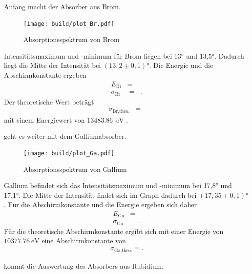 \justifying Anfang macht der Absorber aus Brom.


\begin{figure}[H]
    \centering
    \texttt{[image: build/plot\_Br.pdf]}
    \caption{Absorptionsspektrum von Brom\cite{matplotlib}}
    \label{fig:4}
\end{figure}

\justifying Intensitätsmaximum und -minimum für Brom liegen bei 13° und 13,5°.
Dadurch liegt die Mitte der Intensität bei $(13,2\pm 0,1)°$.
Die Energie und die Abschirmkonstante ergeben
\begin{align}
    E_{\text{Br}}&= \text{ }  \label{eq:27} \\
    \sigma_{\text{Br}}&= \text{ }  \label{eq:28}.
\end{align}
Der theoretische Wert beträgt 
\begin{align}
    \sigma_{\text{Br,theo.}}&= \text{ }  \label{eq:29}
\end{align}
mit einem Energiewert von \SI{13483.86}{\electronvolt} \cite{NIST} .

\justifying geht es weiter mit dem Galliumabsorber.


\begin{figure}[H]
    \centering
    \texttt{[image: build/plot\_Ga.pdf]}
    \caption{Absorptionsspektrum von Gallium\cite{matplotlib}}
    \label{fig:5}
\end{figure}

\justifying Gallium befindet sich das Intensitätsmaximum und -minimum
bei 17,8° und 17,1°. Die Mitte der Intensität
findet sich im Graph dadurch bei $(17,35\pm 0,1)°$.
Für die Abschirmkonstante und die Energie ergeben sich daher
\begin{align}
    E_{\text{Ga}}&= \text{} \label{eq:30}\\
    \sigma _{\text{Ga}} &= \text{} \label{eq:31}.
\end{align}
Für die theoretische Abschirmkonstante ergibt sich 
mit einer Energie von $\SI{10377.76}{\electronvolt} $ \cite{NIST} eine 
Abschirmkonstante von
\begin{align}
    \sigma _{\text{Ga,theo.}} = \text{} \label{eq:32}.
\end{align}


\justifying kommt die Auswertung des Absorbers aus Rubidium.


